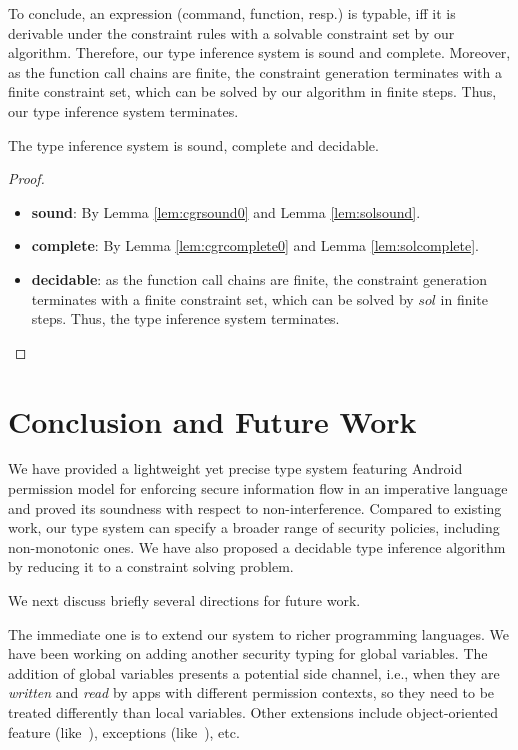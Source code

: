 {{{To conclude, an expression (command, function, resp.) is typable, iff it is derivable under the constraint rules with a solvable constraint set by our algorithm.
Therefore, our type inference system is sound and complete.
Moreover, as the function call chains are finite, the constraint generation terminates with a finite constraint set, which can be solved by our algorithm in finite steps.
Thus, our type inference system terminates.

\begin{theorem}
The type inference system is sound, complete and decidable.
\end{theorem}
\begin{proof}
\begin{itemize}
\item \textbf{sound}: By Lemma  \ref{lem:cgrsound0} and Lemma \ref{lem:solsound}.
\item \textbf{complete}: By Lemma  \ref{lem:cgrcomplete0} and Lemma \ref{lem:solcomplete}.
\item \textbf{decidable}: as the function call chains are finite, the constraint generation terminates with a finite constraint set, which can be solved by $sol$ in finite steps. Thus, the type inference system terminates.
\end{itemize}
\end{proof}



 \section{Conclusion and Future Work}\label{sec:conclusion}

We have provided a lightweight yet precise type system featuring Android permission model for enforcing secure information flow in an
imperative language and proved its soundness with respect to non-interference.
Compared to existing work, our type system can specify a broader range of security policies, including non-monotonic ones.
We have also proposed a decidable type inference algorithm by reducing it to a constraint solving problem.

We next discuss briefly several directions for future work.

The immediate one is to extend our system to richer programming languages. We have been working on adding another security typing for global variables. The addition of global variables presents a potential side channel, i.e., when they are \emph{written} and \emph{read} by apps with different permission contexts, so they need to be treated differently than local variables. Other extensions include object-oriented feature (like~\cite{Sun:SAS04}), exceptions (like~\cite{Barthe:2006jh}), etc.

}}}
